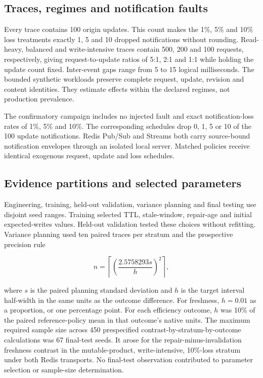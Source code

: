 \documentclass[pdflatex,sn-mathphys-num]{sn-jnl}
\begin{document}
\subsection{Traces, regimes and notification faults}\label{traces-regimes-and-notification-faults}

Every trace contains 100 origin updates. This count makes the 1\%, 5\% and 10\% loss treatments exactly 1, 5 and 10 dropped notifications without rounding. Read-heavy, balanced and write-intensive traces contain 500, 200 and 100 requests, respectively, giving request-to-update ratios of 5:1, 2:1 and 1:1 while holding the update count fixed. Inter-event gaps range from 5 to 15 logical milliseconds. The bounded synthetic workloads preserve complete request, update, revision and content identities. They estimate effects within the declared regimes, not production prevalence.

The confirmatory campaign includes no injected fault and exact notification-loss rates of 1\%, 5\% and 10\%. The corresponding schedules drop 0, 1, 5 or 10 of the 100 update notifications. Redis Pub/Sub and Streams both carry source-bound notification envelopes through an isolated local server. Matched policies receive identical exogenous request, update and loss schedules.

\subsection{Evidence partitions and selected parameters}\label{evidence-partitions-and-selected-parameters}

Engineering, training, held-out validation, variance planning and final testing use disjoint seed ranges. Training selected TTL, stale-window, repair-age and initial expected-writes values. Held-out validation tested these choices without refitting. Variance planning used ten paired traces per stratum and the prospective precision rule

\[
n = \left\lceil \left(\frac{2.5758293s}{h}\right)^2 \right\rceil,
\]

where \(s\) is the paired planning standard deviation and \(h\) is the target interval half-width in the same units as the outcome difference. For freshness, \(h=0.01\) as a proportion, or one percentage point. For each efficiency outcome, \(h\) was 10\% of the paired reference-policy mean in that outcome's native units. The maximum required sample size across 450 prespecified contrast-by-stratum-by-outcome calculations was 67 final-test seeds. It arose for the repair-minus-invalidation freshness contrast in the mutable-product, write-intensive, 10\%-loss stratum under both Redis transports. No final-test observation contributed to parameter selection or sample-size determination.
\end{document}
